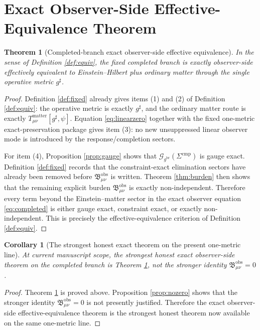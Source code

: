 \documentclass[11pt]{article}
\newcommand{\ObserverMetric}{g^{\mathrm{br}}}
\newcommand{\CompletedMetric}{g^{\sharp}}
\newcommand{\CompShift}{\Sigma^{\mathrm{cmp}}}
\newcommand{\GaugeBook}{\mathcal G_{\ObserverMetric}}
\newcommand{\ObsBurden}{\mathfrak B_{\mu\nu}^{\mathrm{obs}}}
\newtheorem{corollary}{Corollary}
\newtheorem{theorem}{Theorem}
\begin{document}
\section{Exact Observer-Side Effective-Equivalence Theorem}

\begin{theorem}[Completed-branch exact observer-side effective equivalence]
\label{thm:equiv}
In the sense of Definition \ref{def:equiv}, the fixed completed branch is exactly observer-side effectively equivalent to Einstein--Hilbert plus ordinary matter through the single operative metric \(\CompletedMetric\).
\end{theorem}

\begin{proof}
Definition \ref{def:fixed} already gives items (1) and (2) of Definition \ref{def:equiv}: the operative metric is exactly \(\CompletedMetric\), and the ordinary matter route is exactly \(T_{\mu\nu}^{\mathrm{matter}}[\CompletedMetric,\psi]\). Equation \eqref{eq:linearzero} together with the fixed one-metric exact-preservation package gives item (3): no new unsuppressed linear observer mode is introduced by the response/completion sectors.

For item (4), Proposition \ref{prop:gauge} shows that \(\GaugeBook(\CompShift)\) is gauge exact. Definition \ref{def:fixed} records that the constraint-exact elimination sectors have already been removed before \(\ObsBurden\) is written. Theorem \ref{thm:burden} then shows that the remaining explicit burden \(\ObsBurden\) is exactly non-independent. Therefore every term beyond the Einstein--matter sector in the exact observer equation \eqref{eq:completed} is either gauge exact, constraint exact, or exactly non-independent. This is precisely the effective-equivalence criterion of Definition \ref{def:equiv}.
\end{proof}

\begin{corollary}[The strongest honest exact theorem on the present one-metric line]
\label{cor:strongest}
At current manuscript scope, the strongest honest exact observer-side theorem on the completed branch is Theorem \ref{thm:equiv}, not the stronger identity \(\ObsBurden=0\).
\end{corollary}

\begin{proof}
Theorem \ref{thm:equiv} is proved above. Proposition \ref{prop:nozero} shows that the stronger identity \(\ObsBurden=0\) is not presently justified. Therefore the exact observer-side effective-equivalence theorem is the strongest honest theorem now available on the same one-metric line.
\end{proof}
\end{document}

